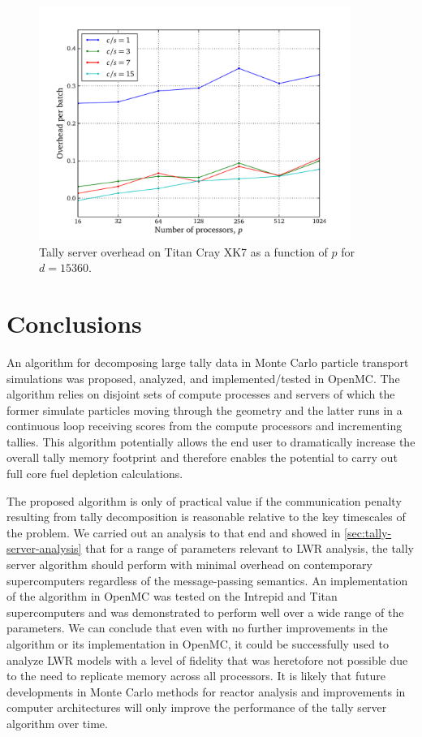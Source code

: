 \begin{figure}[!tbh]
  \centering
  \includegraphics[width=4in]{figures/ch6/results_titan_cs}
  \caption{Tally server overhead on Titan Cray XK7 as a function of $p$ for $d =
    15360$.}
  \label{fig:titan-cs}
\end{figure}

\section{Conclusions}

An algorithm for decomposing large tally data in Monte Carlo particle transport
simulations was proposed, analyzed, and implemented/tested in OpenMC. The
algorithm relies on disjoint sets of compute processes and servers of which the
former simulate particles moving through the geometry and the latter runs in a
continuous loop receiving scores from the compute processors and incrementing
tallies. This algorithm potentially allows the end user to dramatically increase
the overall tally memory footprint and therefore enables the potential to carry
out full core fuel depletion calculations.

The proposed algorithm is only of practical value if the communication penalty
resulting from tally decomposition is reasonable relative to the key timescales
of the problem. We carried out an analysis to that end and showed in
\autoref{sec:tally-server-analysis} that for a range of parameters relevant to 
LWR analysis, the tally server algorithm should perform with minimal overhead on
contemporary supercomputers regardless of the message-passing semantics. An
implementation of the algorithm in OpenMC was tested on the Intrepid and Titan
supercomputers and was demonstrated to perform well over a wide range of the
parameters. We can conclude that even with no further improvements in the
algorithm or its implementation in OpenMC, it could be successfully used to
analyze LWR models with a level of fidelity that was heretofore not possible due
to the need to replicate memory across all processors. It is likely that future
developments in Monte Carlo methods for reactor analysis and improvements in
computer architectures will only improve the performance of the tally server
algorithm over time.

